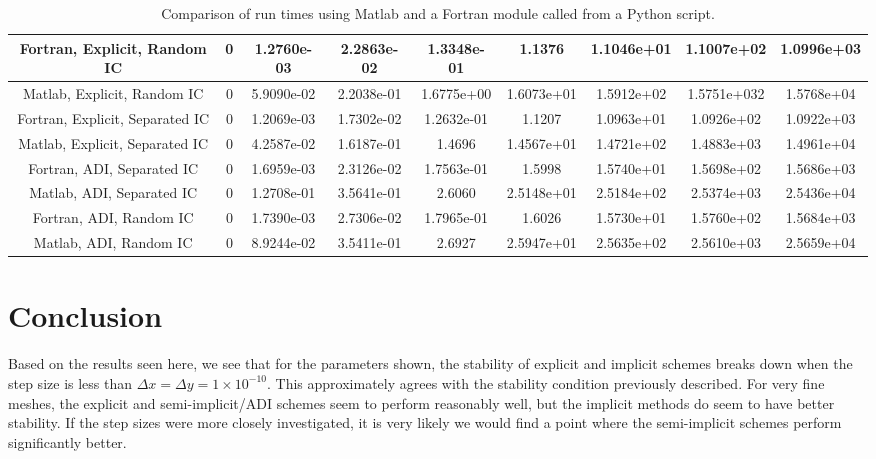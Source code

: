 \documentclass[]{article}
\theoremstyle{definition}
\numberwithin{equation}{section}
\numberwithin{equation}{section}
\begin{document}
\begin{adjustwidth}{-2.5cm}{}
\begin{center}
\begin{table}[H]
\begin{adjustbox}{angle=90}
\begin{tabular} {c|c|c|c|c|c|c|c|c|}
			\multicolumn{1}{|c|}{Fortran, Explicit, Random IC} & 0 &  1.2760e-03 &  2.2863e-02 &  1.3348e-01 & 1.1376 & 1.1046e+01 & 1.1007e+02 & 1.0996e+03 \\
			\hline
			\multicolumn{1}{|c|}{Matlab, Explicit, Random IC} & 0 &     5.9090e-02 &  2.2038e-01&   1.6775e+00  & 1.6073e+01 &  1.5912e+02&   1.5751e+032 &  1.5768e+04 \\
			\hline
			\multicolumn{1}{|c|}{Fortran, Explicit, Separated IC} & 0 & 1.2069e-03 &  1.7302e-02 &  1.2632e-01 & 1.1207 & 1.0963e+01 & 1.0926e+02 & 1.0922e+03  \\
			\hline
			\multicolumn{1}{|c|}{Matlab, Explicit, Separated IC} & 0 & 4.2587e-02 &  1.6187e-01&   1.4696&  1.4567e+01  & 1.4721e+02 &  1.4883e+03  & 1.4961e+04 \\
			\hline
			\multicolumn{1}{|c|}{Fortran, ADI, Separated IC}  & 0 &  1.6959e-03 &  2.3126e-02 &  1.7563e-01 &1.5998 & 1.5740e+01 & 1.5698e+02 & 1.5686e+03 \\
			\hline
			\multicolumn{1}{|c|}{Matlab, ADI, Separated IC}  & 0 &  1.2708e-01  & 3.5641e-01&   2.6060  & 2.5148e+01 &  2.5184e+02  & 2.5374e+03  & 2.5436e+04 \\
			\hline
			\multicolumn{1}{|c|}{Fortran, ADI, Random IC}  & 0 &  1.7390e-03 &  2.7306e-02 & 1.7965e-01 &1.6026 & 1.5730e+01 & 1.5760e+02 & 1.5684e+03  \\
			\hline
			\multicolumn{1}{|c|}{Matlab, ADI, Random IC}  & 0 &  8.9244e-02  & 3.5411e-01 &  2.6927 &  2.5947e+01  & 2.5635e+02 &  2.5610e+03 &   2.5659e+04 \\
			\hline
		\end{tabular}
	\end{adjustbox}
\caption{Comparison of run times using Matlab and a Fortran module called from a Python script.}
\end{table}
	\end{center}
\end{adjustwidth}
\section{Conclusion}
Based on the results seen here, we see that for the parameters shown, the stability of explicit and implicit schemes breaks down when the step size is less than $\Delta x = \Delta y = 1\times 10^{-10}$. This approximately agrees with the stability condition previously described. For very fine meshes, the explicit and semi-implicit/ADI schemes seem to perform reasonably well, but the implicit methods do seem to have better stability. If the step sizes were more closely investigated, it is very likely we would find a point where the semi-implicit schemes perform significantly better.
\end{document}
